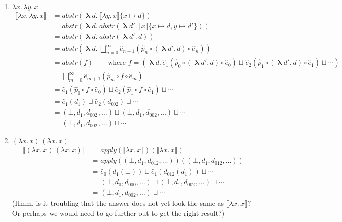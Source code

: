 \documentclass{tufte-handout}
\newcommand{\SEM}[1]{\llbracket #1 \rrbracket}
\newcommand{\LAM}[1]{\lambda #1.\,}
\newcommand{\MLAM}[1]{\boldsymbol\uplambda #1.\,}
\newcommand{\APP}[0]{\,}
\begin{document}
\begin{Answer}
\begin{enumerate}
  \item $\LAM{x}\LAM{y}x$
    \begin{align*}
      \SEM{\LAM{x}\LAM{y}x} &= \mathit{abstr}(\MLAM{d} \SEM{\LAM{y}x}\{x\mapsto d\}) \\
      &= \mathit{abstr}(\MLAM{d} \mathit{abstr}(\MLAM{d'}\SEM{x}\{x\mapsto d,y\mapsto d'\})) \\
      &= \mathit{abstr}(\MLAM{d} \mathit{abstr}(\MLAM{d'}d)) \\
      &= \mathit{abstr}(\MLAM{d} \bigsqcup_{n=0}^\infty \hat{e}_{n+1}(\hat{p}_n \circ (\MLAM{d'}d) \circ \hat{e}_n)) \\
      &= \mathit{abstr}(f)  \qquad \text{where }
f = (\MLAM{d} \hat{e}_{1}(\hat{p}_0 \circ (\MLAM{d'}d) \circ \hat{e}_0)  \sqcup \hat{e}_{2}(\hat{p}_1 \circ (\MLAM{d'}d) \circ \hat{e}_1) \sqcup \cdots )\\
      &= \bigsqcup_{m=0}^\infty \hat{e}_{m+1}(\hat{p}_m \circ f \circ \hat{e}_m)\\
      &= \hat{e}_{1}(\hat{p}_0 \circ f \circ \hat{e}_0)
        \sqcup \hat{e}_{2}(\hat{p}_1 \circ f \circ \hat{e}_1)
        \sqcup \cdots \\
      &= \hat{e}_{1}(d_1)
        \sqcup \hat{e}_{2}(d_{002})
        \sqcup \cdots \\
      &= (\bot, d_1, d_{002}, \ldots)
        \sqcup (\bot, d_1, d_{002}, \ldots)
        \sqcup \cdots \\ 
      &= (\bot, d_1, d_{002}, \ldots) \sqcup \cdots
    \end{align*}

  \item $(\LAM{x}x) \APP (\LAM{x}x)$
    \begin{align*}
      \SEM{(\LAM{x}x) \APP (\LAM{x}x)} 
      &= \mathit{apply}(\SEM{\LAM{x}x})(\SEM{\LAM{x}x}) \\
      &= \mathit{apply}((\bot,d_1,d_{012},\ldots))((\bot,d_1,d_{012},\ldots)) \\
      &= \hat{e}_0(d_1(\bot))
      \sqcup \hat{e}_1(d_{012}(d_1))
      \sqcup \cdots \\
      &= (\bot, d_0, d_{000}, \ldots)
      \sqcup (\bot, d_1, d_{002}, \ldots)
      \sqcup \cdots \\
      &= (\bot, d_1, d_{002}, \ldots) \sqcup \cdots 
    \end{align*}
    (Hmm, is it troubling that the answer does not yet look the
    same as $\SEM{\LAM{x}x}$? Or perhaps we would need to go further
    out to get the right result?)

  \end{enumerate}
\end{Answer}
\end{document}
